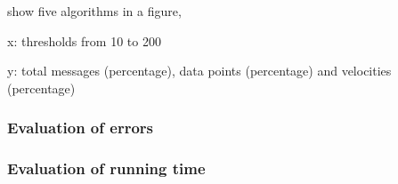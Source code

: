
show five algorithms in a figure, 

x: thresholds from 10 to 200

y: total messages (percentage), data points (percentage) and velocities (percentage)


\subsubsection{Evaluation of errors}

\subsubsection{Evaluation of running time}